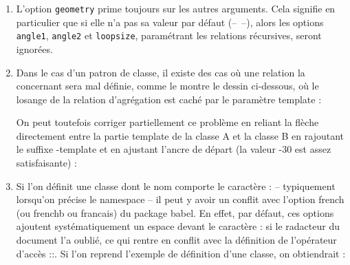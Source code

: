 \documentclass[a4paper,11pt]{report}
\newcommand{\inputTikZ}[1]{%
  }%
\newcommand{\inputTikZ}[1]{%
    \texttt{[image: fig/\#1.pdf]}%
  }%
\begin{document}
\begin{enumerate}
\item L'option {\tt geometry} prime toujours sur les autres arguments. Cela signifie en particulier que si elle n'a pas sa valeur par défaut (--~--), alors les options {\tt angle1}, {\tt angle2} et {\tt loopsize}, paramétrant les relations récursives, seront ignorées.
\item Dans le cas d'un patron de classe, il existe des cas où une relation la concernant sera mal définie, comme le montre le dessin ci-dessous, où le losange de la relation d'agrégation est caché par le paramètre template :

\begin{minipage}{0.6\textwidth}

\end{minipage}
\begin{minipage}{0.4\textwidth}
\begin{center}
\inputTikZ{bugtemplate}
\end{center}
\end{minipage}

\medskip

On peut toutefois corriger partiellement ce problème en reliant la flèche directement entre la partie template de la classe A et la classe B en rajoutant le suffixe -template et en ajustant l'ancre de départ (la valeur -30 est assez satisfaisante) : 

\medskip

\begin{minipage}{0.6\textwidth}

\end{minipage}
\begin{minipage}{0.4\textwidth}
\begin{center}
\inputTikZ{bugtemplate2}
\end{center}
\end{minipage}

\medskip

\item Si l'on définit une classe dont le nom comporte le caractère : -- typiquement lorsqu'on précise le namespace -- il peut y avoir un conflit avec l'option french (ou frenchb ou francais) du package babel. En effet, par défaut, ces options ajoutent systématiquement un espace devant le caractère : si le radacteur du document l'a oublié, ce qui rentre en conflit avec la définition de l'opérateur d'accès ::. Si l'on reprend l'exemple de définition d'une classe, on obtiendrait :


\end{enumerate}
\end{document}
